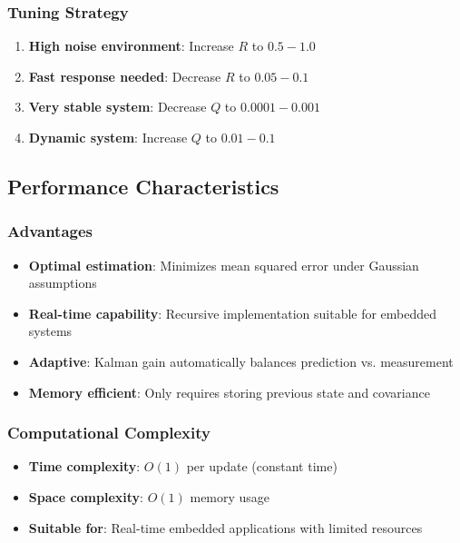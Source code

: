 \documentclass{article}
\begin{document}
\subsubsection{Tuning Strategy}
\begin{enumerate}
    \item \textbf{High noise environment}: Increase $R$ to $0.5-1.0$
    \item \textbf{Fast response needed}: Decrease $R$ to $0.05-0.1$
    \item \textbf{Very stable system}: Decrease $Q$ to $0.0001-0.001$
    \item \textbf{Dynamic system}: Increase $Q$ to $0.01-0.1$
\end{enumerate}

\subsection{Performance Characteristics}

\subsubsection{Advantages}
\begin{itemize}
    \item \textbf{Optimal estimation}: Minimizes mean squared error under Gaussian assumptions
    \item \textbf{Real-time capability}: Recursive implementation suitable for embedded systems
    \item \textbf{Adaptive}: Kalman gain automatically balances prediction vs. measurement
    \item \textbf{Memory efficient}: Only requires storing previous state and covariance
\end{itemize}

\subsubsection{Computational Complexity}
\begin{itemize}
    \item \textbf{Time complexity}: $O(1)$ per update (constant time)
    \item \textbf{Space complexity}: $O(1)$ memory usage
    \item \textbf{Suitable for}: Real-time embedded applications with limited resources
\end{itemize}
\end{document}
